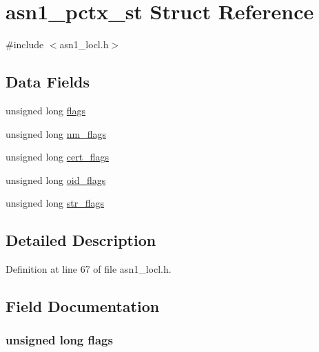 \hypertarget{structasn1__pctx__st}{}\section{asn1\+\_\+pctx\+\_\+st Struct Reference}
\label{structasn1__pctx__st}


{\ttfamily \#include $<$asn1\+\_\+locl.\+h$>$}

\subsection*{Data Fields}
\begin{DoxyCompactItemize}
\item 
unsigned long \hyperlink{structasn1__pctx__st_a9e339c2784bd040b26a5112866700bff}{flags}
\item 
unsigned long \hyperlink{structasn1__pctx__st_a7198bf94e7d93399542ffd768fdff506}{nm\+\_\+flags}
\item 
unsigned long \hyperlink{structasn1__pctx__st_a50577c2360374d8981129375814b4aaa}{cert\+\_\+flags}
\item 
unsigned long \hyperlink{structasn1__pctx__st_abe6d3572d064b442540826f28716a90d}{oid\+\_\+flags}
\item 
unsigned long \hyperlink{structasn1__pctx__st_ada193999dd8e335524373ff079a004a8}{str\+\_\+flags}
\end{DoxyCompactItemize}


\subsection{Detailed Description}


Definition at line 67 of file asn1\+\_\+locl.\+h.



\subsection{Field Documentation}
\subsubsection[{\texorpdfstring{flags}{flags}}]{\setlength{\rightskip}{0pt plus 5cm}unsigned long flags}\hypertarget{structasn1__pctx__st_a9e339c2784bd040b26a5112866700bff}{}\label{structasn1__pctx__st_a9e339c2784bd040b26a5112866700bff}


